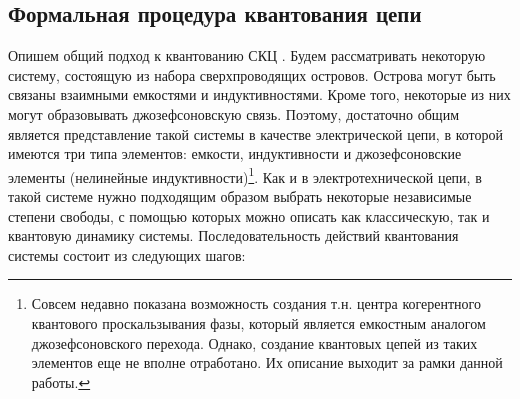 \subsection{Формальная процедура квантования цепи}	
Опишем общий подход к квантованию СКЦ \cite{vool2017introduction}. Будем рассматривать некоторую систему, состоящую из набора сверхпроводящих островов. Острова могут быть связаны взаимными емкостями и индуктивностями. Кроме того, некоторые из них могут образовывать джозефсоновскую связь. Поэтому, достаточно общим является представление такой системы в качестве электрической цепи, в которой имеются три типа элементов: емкости, индуктивности и джозефсоновские элементы (нелинейные индуктивности)\footnote[1]{Совсем недавно \cite{astafiev2012coherent} показана возможность создания т.н. центра когерентного квантового проскальзывания фазы, который является емкостным аналогом джозефсоновского перехода. Однако, создание квантовых цепей из таких элементов еще не вполне отработано. Их описание выходит за рамки данной работы.}. Как и в электротехнической цепи, в такой системе нужно подходящим образом выбрать некоторые независимые степени свободы, с помощью которых можно описать как классическую, так и квантовую динамику системы. Последовательность действий квантования системы состоит из следующих шагов:
